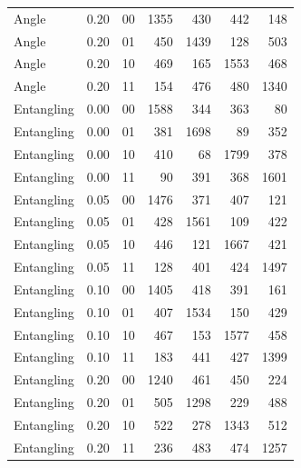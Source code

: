 \begin{table}[htbp]
\begin{tabular}{llcrrrr}
Angle & 0.20 & 00 & 1355 & 430 & 442 & 148 \\
Angle & 0.20 & 01 & 450 & 1439 & 128 & 503 \\
Angle & 0.20 & 10 & 469 & 165 & 1553 & 468 \\
Angle & 0.20 & 11 & 154 & 476 & 480 & 1340 \\
\midrule
Entangling & 0.00 & 00 & 1588 & 344 & 363 & 80 \\
Entangling & 0.00 & 01 & 381 & 1698 & 89 & 352 \\
Entangling & 0.00 & 10 & 410 & 68 & 1799 & 378 \\
Entangling & 0.00 & 11 & 90 & 391 & 368 & 1601 \\
Entangling & 0.05 & 00 & 1476 & 371 & 407 & 121 \\
Entangling & 0.05 & 01 & 428 & 1561 & 109 & 422 \\
Entangling & 0.05 & 10 & 446 & 121 & 1667 & 421 \\
Entangling & 0.05 & 11 & 128 & 401 & 424 & 1497 \\
Entangling & 0.10 & 00 & 1405 & 418 & 391 & 161 \\
Entangling & 0.10 & 01 & 407 & 1534 & 150 & 429 \\
Entangling & 0.10 & 10 & 467 & 153 & 1577 & 458 \\
Entangling & 0.10 & 11 & 183 & 441 & 427 & 1399 \\
Entangling & 0.20 & 00 & 1240 & 461 & 450 & 224 \\
Entangling & 0.20 & 01 & 505 & 1298 & 229 & 488 \\
Entangling & 0.20 & 10 & 522 & 278 & 1343 & 512 \\
Entangling & 0.20 & 11 & 236 & 483 & 474 & 1257 \\
\bottomrule
\end{tabular}
\end{table}
